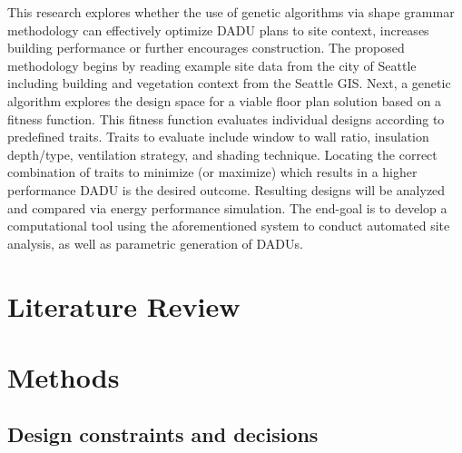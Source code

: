 \documentclass[sagev,times,Review]{sagej}
\begin{document}
This research explores whether the use of genetic algorithms via shape grammar methodology can effectively optimize DADU plans to site context, increases building performance or further encourages construction. The proposed methodology begins by reading example site data from the city of Seattle including building and vegetation context from the Seattle GIS. Next, a genetic algorithm explores the design space for a viable floor plan solution based on a fitness function. This fitness function evaluates individual designs according to predefined traits. Traits to evaluate include window to wall ratio, insulation depth/type, ventilation strategy, and shading technique. Locating the correct combination of traits to minimize (or maximize) which results in a higher performance DADU is the desired outcome. Resulting designs will be analyzed and compared via energy performance simulation. The end-goal is to develop a computational tool using the aforementioned system to conduct automated site analysis, as well as parametric generation of DADUs.

\section{Literature Review}

\section{Methods} 
\subsection{Design constraints and decisions}
\end{document}

